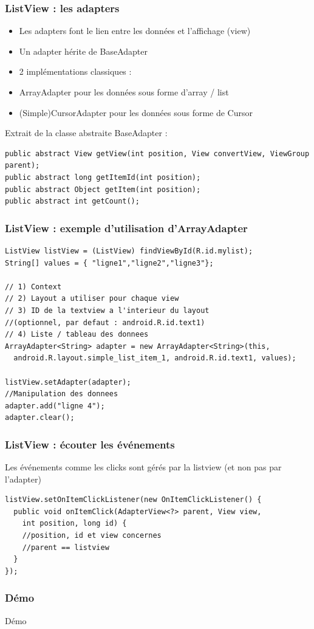 \documentclass{beamer}
\begin{document}
\begin{frame}[fragile]
\frametitle{ListView : les adapters}
\begin{itemize}
  \item Les adapters font le lien entre les données et l'affichage (view) 
  \item Un adapter hérite de BaseAdapter
  \item 2 implémentations classiques : 
  \item ArrayAdapter pour les données sous forme d'array / list
  \item (Simple)CursorAdapter pour les données sous forme de Cursor
\end{itemize}
Extrait de la classe abstraite BaseAdapter :
\begin{lstlisting}
public abstract View getView(int position, View convertView, ViewGroup parent);
public abstract long getItemId(int position);
public abstract Object getItem(int position);
public abstract int getCount();
\end{lstlisting}
\end{frame}
\begin{frame}[fragile]
\frametitle{ListView : exemple d'utilisation d'ArrayAdapter}
\begin{lstlisting}
ListView listView = (ListView) findViewById(R.id.mylist);
String[] values = { "ligne1","ligne2","ligne3"};

// 1) Context
// 2) Layout a utiliser pour chaque view
// 3) ID de la textview a l'interieur du layout 
//(optionnel, par defaut : android.R.id.text1) 
// 4) Liste / tableau des donnees
ArrayAdapter<String> adapter = new ArrayAdapter<String>(this,
  android.R.layout.simple_list_item_1, android.R.id.text1, values);

listView.setAdapter(adapter); 
//Manipulation des donnees
adapter.add("ligne 4");
adapter.clear();
\end{lstlisting}
\end{frame}
\begin{frame}[fragile]
\frametitle{ListView : écouter les événements}
Les événements comme les clicks sont gérés par la listview (et non pas par l'adapter)
\begin{lstlisting}
listView.setOnItemClickListener(new OnItemClickListener() {
  public void onItemClick(AdapterView<?> parent, View view,
    int position, long id) {
    //position, id et view concernes 
    //parent == listview
  }
});
\end{lstlisting}
\end{frame}
\begin{frame}[fragile]
\frametitle{Démo}
Démo
\end{frame}
\end{document}
